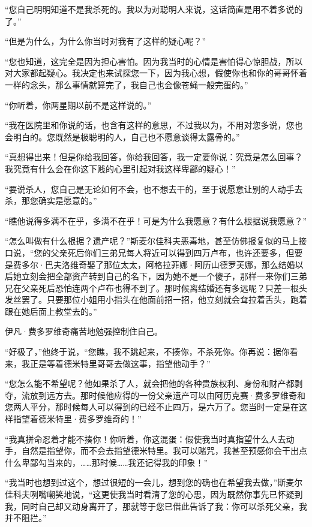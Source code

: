 \par “您自己明明知道不是我杀死的。我以为对聪明人来说，这话简直是用不着多说的了。”
\par “但是为什么，为什么你当时对我有了这样的疑心呢？”
\par “您也知道，这完全是因为担心害怕。因为我当时的心情是害怕得心惊胆战，所以对大家都起疑心。我决定也来试探您一下，因为我心想，假使你也和你的哥哥怀着一样的念头，那么事情就算完了，我自己也会像苍蝇一般完蛋的。”
\par “你听着，你两星期以前不是这样说的。”
\par “我在医院里和你说的话，也含有这样的意思，不过我以为，不用对您多说，您也会明白的。您既然是极聪明的人，自己也不愿意谈得太露骨的。”
\par “真想得出来！但是你给我回答，你给我回答，我一定要你说：究竟是怎么回事？我究竟有什么会在你这下贱的心里引起对我这样卑鄙的疑心！”
\par “要说杀人，您自己是无论如何不会，也不想去干的，至于说愿意让别的人动手去杀，那您确实是愿意的。”
\par “瞧他说得多满不在乎，多满不在乎！可是为什么我愿意？有什么根据说我愿意？”
\par “怎么叫做有什么根据？遗产呢？”斯麦尔佳科夫恶毒地，甚至仿佛报复似的马上接口说，“您的父亲死后你们三弟兄每人将近可以得到四万卢布，也许还要多，但要是费多尔·巴夫洛维奇娶了那位太太，阿格拉菲娜·阿历山德罗芙娜，那么结婚以后她立刻会把全部资产转到自己的名下，因为她不是一个傻子，那样一来你们三弟兄在父亲死后恐怕连两个卢布也得不到了。那时候离结婚还有多远呢？只差一根头发丝罢了。只要那位小姐用小指头在他面前招一招，他立刻就会耷拉着舌头，跑着跟在她后面上教堂去的。”
\par 伊凡·费多罗维奇痛苦地勉强控制住自己。
\par “好极了，”他终于说，“您瞧，我不跳起来，不揍你，不杀死你。你再说：据你看来，我正是等着德米特里哥哥去做这事，指望他动手？”
\par “您怎么能不希望呢？他如果杀了人，就会把他的各种贵族权利、身份和财产都剥夺，流放到远方去。那时候他应得的一份父亲遗产可以由阿历克赛·费多罗维奇和您两人平分，那时候每人可以得到的已经不止四万，是六万了。您当时一定是在这样指望着德米特里·费多罗维奇的！”
\par “我真拼命忍着才能不揍你！你听着，你这混蛋：假使我当时真指望什么人去动手，自然是指望你，而不会去指望德米特里。我可以赌咒，我甚至预感你会干出点什么卑鄙勾当来的，……那时候……我还记得我的印象！”
\par “我当时也想到过这个，想过很短的一会儿，想到您的确也在希望我去做，”斯麦尔佳科夫咧嘴嘲笑地说，“这更使我当时看清了您的心思，因为既然你事先已怀疑到我，同时自己却又动身离开了，那就等于您已借此告诉了我：你可以杀死父亲，我并不阻拦。”
